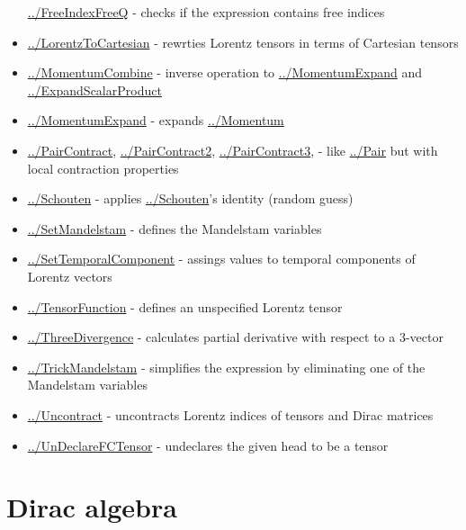 \documentclass[../FeynCalcManual.tex]{subfiles}
\begin{document}
\begin{itemize}
  \hyperlink{../freeindexfreeq}{../FreeIndexFreeQ} - checks if the
  expression contains free indices
\item
  \hyperlink{../lorentztocartesian}{../LorentzToCartesian} - rewrties
  Lorentz tensors in terms of Cartesian tensors
\item
  \hyperlink{../momentumcombine}{../MomentumCombine} - inverse operation
  to \hyperlink{../momentumexpand}{../MomentumExpand} and
  \hyperlink{../expandscalarproduct}{../ExpandScalarProduct}
\item
  \hyperlink{../momentumexpand}{../MomentumExpand} - expands
  \hyperlink{../momentum}{../Momentum}
\item
  \hyperlink{../paircontract}{../PairContract},
  \hyperlink{../paircontract2}{../PairContract2},
  \hyperlink{../paircontract3}{../PairContract3}, - like
  \hyperlink{../pair}{../Pair} but with local contraction properties
\item
  \hyperlink{../schouten}{../Schouten} - applies
  \hyperlink{../schouten}{../Schouten}'s identity (random guess)
\item
  \hyperlink{../setmandelstam}{../SetMandelstam} - defines the
  Mandelstam variables
\item
  \hyperlink{../settemporalcomponent}{../SetTemporalComponent} - assings
  values to temporal components of Lorentz vectors
\item
  \hyperlink{../tensorfunction}{../TensorFunction} - defines an
  unspecified Lorentz tensor
\item
  \hyperlink{../threedivergence}{../ThreeDivergence} - calculates
  partial derivative with respect to a \(3\)-vector
\item
  \hyperlink{../trickmandelstam}{../TrickMandelstam} - simplifies the
  expression by eliminating one of the Mandelstam variables
\item
  \hyperlink{../uncontract}{../Uncontract} - uncontracts Lorentz indices
  of tensors and Dirac matrices
\item
  \hyperlink{../undeclarefctensor}{../UnDeclareFCTensor} - undeclares
  the given head to be a tensor
\end{itemize}

\hypertarget{dirac algebra}{
\section{Dirac algebra}\label{dirac algebra}}
\end{document}

